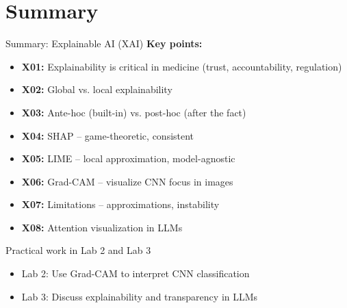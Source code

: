 \documentclass[aspectratio=169, 10pt]{beamer}
\begin{document}
\section*{Summary}

\begin{frame}{Summary: Explainable AI (XAI)}
    \textbf{Key points:}
    \begin{itemize}
        \item \textbf{X01:} Explainability is critical in medicine (trust, accountability, regulation)
        \item \textbf{X02:} Global vs. local explainability
        \item \textbf{X03:} Ante-hoc (built-in) vs. post-hoc (after the fact)
        \item \textbf{X04:} SHAP -- game-theoretic, consistent
        \item \textbf{X05:} LIME -- local approximation, model-agnostic
        \item \textbf{X06:} Grad-CAM -- visualize CNN focus in images
        \item \textbf{X07:} Limitations -- approximations, instability
        \item \textbf{X08:} Attention visualization in LLMs
    \end{itemize}
    
    \vspace{0.2cm}
    {\small
    \begin{block}{Practical work in Lab 2 and Lab 3}
        \begin{itemize}
            \item Lab 2: Use Grad-CAM to interpret CNN classification
            \item Lab 3: Discuss explainability and transparency in LLMs
        \end{itemize}
    \end{block}
    }
\end{frame}
\end{document}
